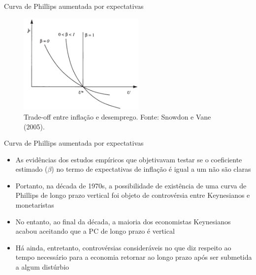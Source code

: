 \documentclass[10pt]{beamer}
\begin{document}
\begin{frame}{Curva de Phillips aumentada por expectativas}
    \begin{figure}
        \centering
        \includegraphics[width=0.55\textwidth]{./figures/aula10_fig12.PNG}
        \caption{Trade-off entre inflação e desemprego. Fonte: Snowdon e Vane (2005).}
        \label{fig12}
    \end{figure}
\end{frame}

\begin{frame}{Curva de Phillips aumentada por expectativas}
    \begin{itemize}
        \item As evidências dos estudos empíricos que objetivavam testar se o coeficiente estimado ($\beta$) no termo de expectativas de inflação é igual a um não são claras
        \bigskip
        \item Portanto, na década de 1970s, a possibilidade de existência de uma curva de Phillips de longo prazo vertical foi objeto de controvérsia entre Keynesianos e monetaristas
        \bigskip
        \item No entanto, ao final da década, a maioria dos economistas Keynesianos acabou aceitando que a PC de longo prazo é vertical
        \bigskip
        \item Há ainda, entretanto, controvérsias consideráveis no que diz respeito ao tempo necessário para a economia retornar ao longo prazo após ser submetida a algum distúrbio
    \end{itemize}    
\end{frame}
\end{document}
